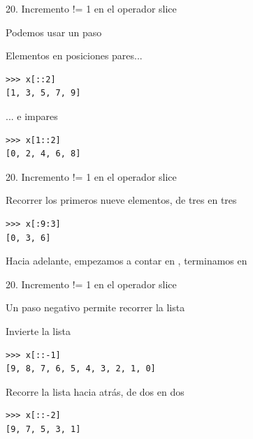 \documentclass[14pt]{beamer}
\begin{document}
\begin{frame}[fragile]
  {20. \large Incremento != 1 en el operador slice}
  \begin{block}{}
    \large
    \centering
    Podemos usar un paso 
  \end{block}

  \small
  \begin{exampleblock}
    {Elementos en posiciones pares...}
    \begin{lstlisting}
>>> x[::2]
[1, 3, 5, 7, 9]
    \end{lstlisting}
  \end{exampleblock}

  \begin{exampleblock}
    {... e impares}
    \begin{lstlisting}
>>> x[1::2]
[0, 2, 4, 6, 8]
    \end{lstlisting}
  \end{exampleblock}
\end{frame}

\begin{frame}[fragile]
  {20. \large Incremento != 1 en el operador slice}
  \begin{exampleblock}
    {Recorrer los primeros nueve elementos, de tres en tres}
    \begin{lstlisting}
>>> x[:9:3]
[0, 3, 6]
    \end{lstlisting}
  \end{exampleblock}

  \begin{alertblock}{}
    \small
    \centering
    Hacia adelante, empezamos a contar en , terminamos
    en 
  \end{alertblock}
\end{frame}

\begin{frame}[fragile]
  {20. \large Incremento != 1 en el operador slice}
  \begin{block}{}
    \centering
    Un paso negativo permite recorrer la lista 
  \end{block}

  \small
  \begin{exampleblock}
    {Invierte la lista}
    \begin{lstlisting}
>>> x[::-1]
[9, 8, 7, 6, 5, 4, 3, 2, 1, 0]
    \end{lstlisting}
  \end{exampleblock}

  \begin{exampleblock}
    {Recorre la lista hacia atrás, de dos en dos}
    \begin{lstlisting}
>>> x[::-2]
[9, 7, 5, 3, 1]
    \end{lstlisting}
  \end{exampleblock}
\end{frame}
\end{document}
